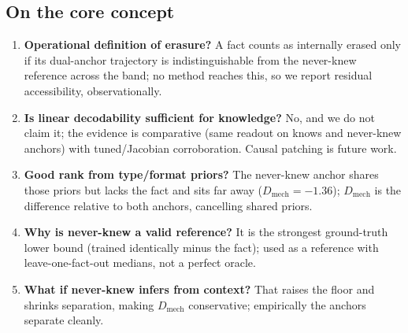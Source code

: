 \documentclass[11pt,a4paper]{article}
\newcommand{\dmech}{\ensuremath{D_{\text{mech}}}}
\begin{document}
\subsection*{On the core concept}
\begin{enumerate}[label=\arabic*.]
\item \textbf{Operational definition of erasure?} A fact counts as internally erased only if its
dual-anchor trajectory is indistinguishable from the never-knew reference across the band; no method reaches
this, so we report residual accessibility, observationally.
\item \textbf{Is linear decodability sufficient for knowledge?} No, and we do not claim it; the evidence is
comparative (same readout on knows and never-knew anchors) with tuned/Jacobian corroboration. Causal
patching is future work.
\item \textbf{Good rank from type/format priors?} The never-knew anchor shares those priors but lacks the
fact and sits far away ($\dmech=-1.36$); \dmech{} is the difference relative to both anchors, cancelling
shared priors.
\item \textbf{Why is never-knew a valid reference?} It is the strongest ground-truth lower bound (trained
identically minus the fact); used as a reference with leave-one-fact-out medians, not a perfect oracle.
\item \textbf{What if never-knew infers from context?} That raises the floor and shrinks separation, making
\dmech{} conservative; empirically the anchors separate cleanly.
\end{enumerate}
\end{document}
